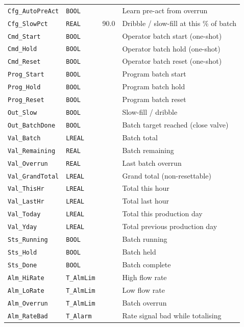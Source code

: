\begin{small}
\begin{longtable}{@{}P{3.70cm}P{2.20cm}P{1.70cm}P{8.91cm}@{}}
\texttt{Cfg\_AutoPreAct} & \texttt{BOOL} &  & Learn pre-act from overrun \\
\texttt{Cfg\_SlowPct} & \texttt{REAL} & 90.0 & Dribble /\allowbreak{} slow-fill at this \% of batch \\
\texttt{Cmd\_Start} & \texttt{BOOL} &  & Operator batch start (one-shot) \\
\texttt{Cmd\_Hold} & \texttt{BOOL} &  & Operator batch hold (one-shot) \\
\texttt{Cmd\_Reset} & \texttt{BOOL} &  & Operator batch reset (one-shot) \\
\texttt{Prog\_Start} & \texttt{BOOL} &  & Program batch start \\
\texttt{Prog\_Hold} & \texttt{BOOL} &  & Program batch hold \\
\texttt{Prog\_Reset} & \texttt{BOOL} &  & Program batch reset \\
\texttt{Out\_Slow} & \texttt{BOOL} &  & Slow-fill /\allowbreak{} dribble \\
\texttt{Out\_BatchDone} & \texttt{BOOL} &  & Batch target reached (close valve) \\
\texttt{Val\_Batch} & \texttt{LREAL} &  & Batch total \\
\texttt{Val\_Remaining} & \texttt{REAL} &  & Batch remaining \\
\texttt{Val\_Overrun} & \texttt{REAL} &  & Last batch overrun \\
\texttt{Val\_GrandTotal} & \texttt{LREAL} &  & Grand total (non-resettable) \\
\texttt{Val\_ThisHr} & \texttt{LREAL} &  & Total this hour \\
\texttt{Val\_LastHr} & \texttt{LREAL} &  & Total last hour \\
\texttt{Val\_Today} & \texttt{LREAL} &  & Total this production day \\
\texttt{Val\_Yday} & \texttt{LREAL} &  & Total previous production day \\
\texttt{Sts\_Running} & \texttt{BOOL} &  & Batch running \\
\texttt{Sts\_Hold} & \texttt{BOOL} &  & Batch held \\
\texttt{Sts\_Done} & \texttt{BOOL} &  & Batch complete \\
\texttt{Alm\_HiRate} & \texttt{T\_AlmLim} &  & High flow rate \\
\texttt{Alm\_LoRate} & \texttt{T\_AlmLim} &  & Low flow rate \\
\texttt{Alm\_Overrun} & \texttt{T\_AlmLim} &  & Batch overrun \\
\texttt{Alm\_RateBad} & \texttt{T\_Alarm} &  & Rate signal bad while totalising \\
\bottomrule
\end{longtable}
\end{small}

